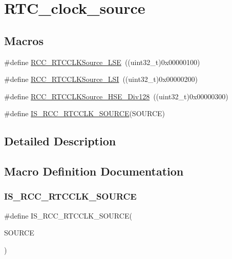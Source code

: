 \hypertarget{group___r_t_c__clock__source}{}\section{R\+T\+C\+\_\+clock\+\_\+source}
\label{group___r_t_c__clock__source}
\subsection*{Macros}
\begin{DoxyCompactItemize}
\item 
\#define \mbox{\hyperlink{group___r_t_c__clock__source_ga18c0c40ff4289148c9fa44c6848d5552}{R\+C\+C\+\_\+\+R\+T\+C\+C\+L\+K\+Source\+\_\+\+L\+SE}}~((uint32\+\_\+t)0x00000100)
\item 
\#define \mbox{\hyperlink{group___r_t_c__clock__source_ga7758c87e4584bfa76cb99c726b7162c3}{R\+C\+C\+\_\+\+R\+T\+C\+C\+L\+K\+Source\+\_\+\+L\+SI}}~((uint32\+\_\+t)0x00000200)
\item 
\#define \mbox{\hyperlink{group___r_t_c__clock__source_gada0bedcd0afa5104ec0ef398d1ac2778}{R\+C\+C\+\_\+\+R\+T\+C\+C\+L\+K\+Source\+\_\+\+H\+S\+E\+\_\+\+Div128}}~((uint32\+\_\+t)0x00000300)
\item 
\#define \mbox{\hyperlink{group___r_t_c__clock__source_gae76a0340b02b5342e756fa0d2112ebf5}{I\+S\+\_\+\+R\+C\+C\+\_\+\+R\+T\+C\+C\+L\+K\+\_\+\+S\+O\+U\+R\+CE}}(S\+O\+U\+R\+CE)
\end{DoxyCompactItemize}


\subsection{Detailed Description}


\subsection{Macro Definition Documentation}
\mbox{\label{group___r_t_c__clock__source_gae76a0340b02b5342e756fa0d2112ebf5}} 
\subsubsection{\texorpdfstring{IS\_RCC\_RTCCLK\_SOURCE}{IS\_RCC\_RTCCLK\_SOURCE}}
{\footnotesize\ttfamily \#define I\+S\+\_\+\+R\+C\+C\+\_\+\+R\+T\+C\+C\+L\+K\+\_\+\+S\+O\+U\+R\+CE(\begin{DoxyParamCaption}\item[{}]{S\+O\+U\+R\+CE }\end{DoxyParamCaption})}


